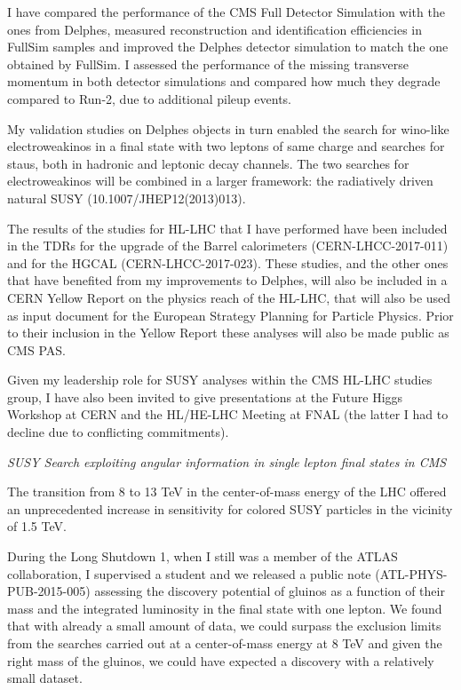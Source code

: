 \documentclass[]{cv} %
\begin{document}
\begin{statement}
I have compared the performance of the CMS Full Detector Simulation with the
ones from Delphes, measured reconstruction and identification efficiencies in
FullSim samples and improved the Delphes detector simulation to match the one
obtained by FullSim. I assessed the performance of the missing transverse
momentum in both detector simulations and compared how much they degrade
compared to Run-2, due to additional pileup events.

My validation studies on Delphes objects in turn enabled the search for
wino-like electroweakinos in a final state with two leptons of same charge and
searches for staus, both in hadronic and leptonic decay channels. The two
searches for electroweakinos will be combined in a larger framework: the
radiatively driven natural SUSY (10.1007/JHEP12(2013)013).

The results of the studies for HL-LHC that I have performed have been included
in the TDRs for the upgrade of the Barrel calorimeters (CERN-LHCC-2017-011) and
for the HGCAL (CERN-LHCC-2017-023). These studies, and the other ones that have
benefited from my improvements to Delphes, will also be included in a CERN
Yellow Report on the physics reach of the HL-LHC, that will also be used as
input document for the European Strategy Planning for Particle Physics. Prior to
their inclusion in the Yellow Report these analyses will also be made public as
CMS PAS.

Given my leadership role for SUSY analyses within the CMS HL-LHC studies group,
I have also been invited to give presentations at the Future Higgs Workshop at
CERN and the HL/HE-LHC Meeting at FNAL (the latter I had to decline due to
conflicting commitments).

\vspace{15pt}
\Large{}
\textit{SUSY Search exploiting angular information in single lepton final states in CMS}
\normalsize{}

The transition from 8 to 13 TeV in the center-of-mass energy of the LHC offered
an unprecedented increase in sensitivity for colored SUSY particles in the
vicinity of 1.5 TeV.

During the Long Shutdown 1, when I still was a member of the ATLAS
collaboration, I supervised a student and we released a public note
(ATL-PHYS-PUB-2015-005) assessing the discovery potential of gluinos as a
function of their mass and the integrated luminosity in the final state with one
lepton. We found that with already a small amount of data, we could surpass the
exclusion limits from the searches carried out at a center-of-mass energy at 8
TeV and given the right mass of the gluinos, we could have expected a discovery
with a relatively small dataset.


\end{statement}
\end{document}
